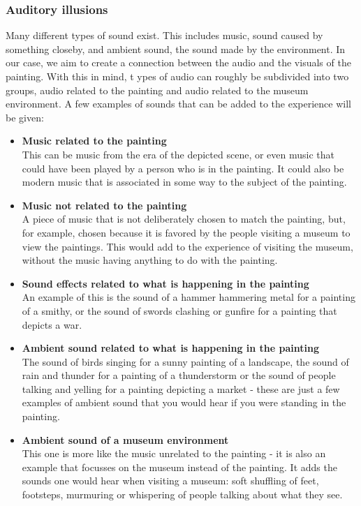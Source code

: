 \documentclass[a4paper]{article}
\begin{document}
\subsubsection{Auditory illusions} \label{sec:audioeffects}

Many different types of sound exist. This includes music, sound caused by something closeby, and ambient sound, the sound made by the environment. In our case, we aim to create a connection between the audio and the visuals of the painting. With this in mind, t ypes of audio can roughly be subdivided into two groups, audio related to the painting and audio related to the museum environment. A few examples of sounds that can be added to the experience will be given: 

\begin {itemize}

\item{\textbf{Music related to the painting}}
\\This can be music from the era of the depicted scene, or even music that could have been played by a person who is in the painting. It could also be modern music that is associated in some way to the subject of the painting. 

\item{\textbf{Music not related to the painting}}
\\A piece of music that is not deliberately chosen to match the painting, but, for example, chosen because it is favored by the people visiting a museum to view the paintings. This would add to the experience of visiting the museum, without the music having anything to do with the painting. 

\item{\textbf{Sound effects related to what is happening in the painting}}
\\An example of this is the sound of a hammer hammering metal for a painting of a smithy, or the sound of swords clashing or gunfire for a painting that depicts a war. 

\item{\textbf{Ambient sound related to what is happening in the painting}}
\\The sound of birds singing for a sunny painting of a landscape, the sound of rain and thunder for a painting of a thunderstorm or the sound of people talking and yelling for a painting depicting a market - these are just a few examples of ambient sound that you would hear if you were standing in the painting.

\item{\textbf{Ambient sound of a museum environment}}
\\This one is more like the music unrelated to the painting - it is also an example that focusses on the museum instead of the painting. It adds the sounds one would hear when visiting a museum: soft shuffling of feet, footsteps, murmuring or whispering of people talking about what they see. 

\end{itemize}
\end{document}

